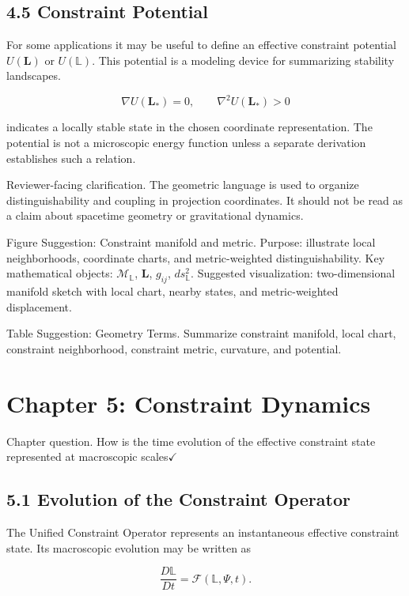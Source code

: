 \documentclass[aps,pre,reprint,superscriptaddress,nofootinbib]{revtex4-2}
\begin{document}
\subsection{4.5 Constraint Potential}

For some applications it may be useful to define an effective constraint potential \(U(\mathbf{L})\) or \(U(\mathbb{L})\). This potential is a modeling device for summarizing stability landscapes.

\[ \nabla U(\mathbf{L}_*)=0, \qquad \nabla^2 U(\mathbf{L}_*)>0 \]

indicates a locally stable state in the chosen coordinate representation. The potential is not a microscopic energy function unless a separate derivation establishes such a relation.

Reviewer-facing clarification. The geometric language is used to organize distinguishability and coupling in projection coordinates. It should not be read as a claim about spacetime geometry or gravitational dynamics.

Figure Suggestion: Constraint manifold and metric. Purpose: illustrate local neighborhoods, coordinate charts, and metric-weighted distinguishability. Key mathematical objects: \(\mathcal{M}_{\mathbb{L}}\), \(\mathbf{L}\), \(g_{ij}\), \(ds_{\mathbb{L}}^2\). Suggested visualization: two-dimensional manifold sketch with local chart, nearby states, and metric-weighted displacement.

Table Suggestion: Geometry Terms. Summarize constraint manifold, local chart, constraint neighborhood, constraint metric, curvature, and potential.

\section{Chapter 5: Constraint Dynamics}

Chapter question. How is the time evolution of the effective constraint state represented at macroscopic scales$\checkmark$

\subsection{5.1 Evolution of the Constraint Operator}

The Unified Constraint Operator represents an instantaneous effective constraint state. Its macroscopic evolution may be written as

\[ \frac{D\mathbb{L}}{Dt}=\mathcal{F}(\mathbb{L},\Psi,t). \]
\end{document}
